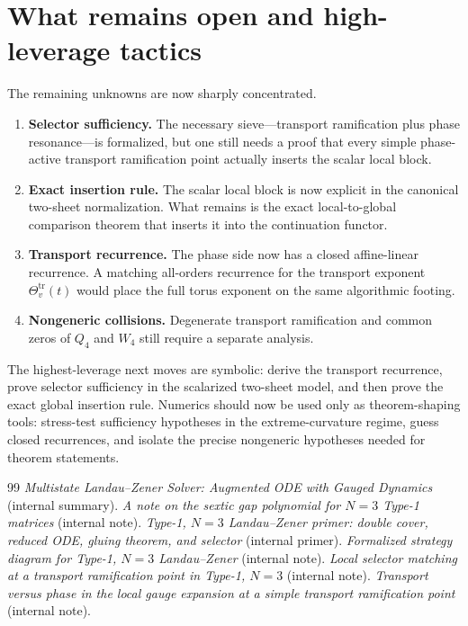 \documentclass[11pt]{article}
\newcommand{\Wfour}{W_4}
\newcommand{\Qfour}{Q_4}
\begin{document}
\section{What remains open and high-leverage tactics}
The remaining unknowns are now sharply concentrated.
\begin{enumerate}[leftmargin=2em,itemsep=2pt]
\item \textbf{Selector sufficiency.} The necessary sieve---transport ramification plus phase resonance---is formalized, but one still needs a proof that every simple phase-active transport ramification point actually inserts the scalar local block.
\item \textbf{Exact insertion rule.} The scalar local block is now explicit in the canonical two-sheet normalization. What remains is the exact local-to-global comparison theorem that inserts it into the continuation functor.
\item \textbf{Transport recurrence.} The phase side now has a closed affine-linear recurrence. A matching all-orders recurrence for the transport exponent $\Theta_v^{\mathrm{tr}}(t)$ would place the full torus exponent on the same algorithmic footing.
\item \textbf{Nongeneric collisions.} Degenerate transport ramification and common zeros of $\Qfour$ and $\Wfour$ still require a separate analysis.
\end{enumerate}

The highest-leverage next moves are symbolic: derive the transport recurrence, prove selector sufficiency in the scalarized two-sheet model, and then prove the exact global insertion rule. Numerics should now be used only as theorem-shaping tools: stress-test sufficiency hypotheses in the extreme-curvature regime, guess closed recurrences, and isolate the precise nongeneric hypotheses needed for theorem statements.

\begin{thebibliography}{99}
 \emph{Multistate Landau--Zener Solver: Augmented ODE with Gauged Dynamics} (internal summary).
 \emph{A note on the sextic gap polynomial for $N=3$ Type-1 matrices} (internal note).
 \emph{Type-1, $N=3$ Landau--Zener primer: double cover, reduced ODE, gluing theorem, and selector} (internal primer).
 \emph{Formalized strategy diagram for Type-1, $N=3$ Landau--Zener} (internal note).
 \emph{Local selector matching at a transport ramification point in Type-1, $N=3$} (internal note).
 \emph{Transport versus phase in the local gauge expansion at a simple transport ramification point} (internal note).
\end{thebibliography}
\end{document}
